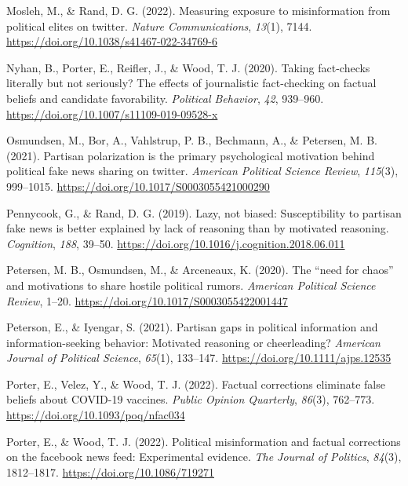 \documentclass[
  12pt,
]{article}
\newlength{\cslhangindent}
\newlength{\cslentryspacingunit} %
\newenvironment{CSLReferences}[2] %
 {%
  \setlength{\parindent}{0pt}
  \ifodd #1
  \let\oldpar\par
  \def\par{\hangindent=\cslhangindent\oldpar}
  \fi
  \setlength{\parskip}{#2\cslentryspacingunit}
 }%
 {}
\begin{document}
\begin{CSLReferences}{1}{0}
\leavevmode{}%
Mosleh, M., \& Rand, D. G. (2022). Measuring exposure to misinformation
from political elites on twitter. \emph{Nature Communications},
\emph{13}(1), 7144. \url{https://doi.org/10.1038/s41467-022-34769-6}

\leavevmode{}%
Nyhan, B., Porter, E., Reifler, J., \& Wood, T. J. (2020). Taking
fact-checks literally but not seriously? The effects of journalistic
fact-checking on factual beliefs and candidate favorability.
\emph{Political Behavior}, \emph{42}, 939--960.
\url{https://doi.org/10.1007/s11109-019-09528-x}

\leavevmode{}%
Osmundsen, M., Bor, A., Vahlstrup, P. B., Bechmann, A., \& Petersen, M.
B. (2021). Partisan polarization is the primary psychological motivation
behind political fake news sharing on twitter. \emph{American Political
Science Review}, \emph{115}(3), 999--1015.
\url{https://doi.org/10.1017/S0003055421000290}

\leavevmode{}%
Pennycook, G., \& Rand, D. G. (2019). Lazy, not biased: Susceptibility
to partisan fake news is better explained by lack of reasoning than by
motivated reasoning. \emph{Cognition}, \emph{188}, 39--50.
\url{https://doi.org/10.1016/j.cognition.2018.06.011}

\leavevmode{}%
Petersen, M. B., Osmundsen, M., \& Arceneaux, K. (2020). The {``need for
chaos''} and motivations to share hostile political rumors.
\emph{American Political Science Review}, 1--20.
\url{https://doi.org/10.1017/S0003055422001447}

\leavevmode{}%
Peterson, E., \& Iyengar, S. (2021). Partisan gaps in political
information and information-seeking behavior: Motivated reasoning or
cheerleading? \emph{American Journal of Political Science},
\emph{65}(1), 133--147. \url{https://doi.org/10.1111/ajps.12535}

\leavevmode{}%
Porter, E., Velez, Y., \& Wood, T. J. (2022). Factual corrections
eliminate false beliefs about COVID-19 vaccines. \emph{Public Opinion
Quarterly}, \emph{86}(3), 762--773.
\url{https://doi.org/10.1093/poq/nfac034}

\leavevmode{}%
Porter, E., \& Wood, T. J. (2022). Political misinformation and factual
corrections on the facebook news feed: Experimental evidence. \emph{The
Journal of Politics}, \emph{84}(3), 1812--1817.
\url{https://doi.org/10.1086/719271}


\end{CSLReferences}
\end{document}

